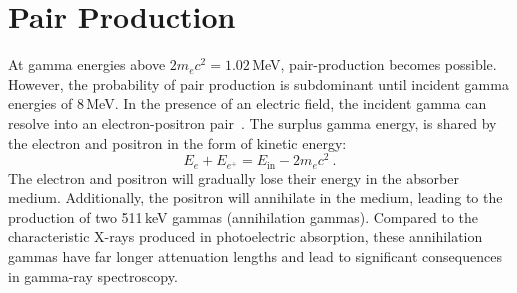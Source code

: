\section{Pair Production}
At gamma energies above $2m_ec^2 = 1.02$\,MeV, pair-production becomes possible. However, the probability of pair production is subdominant until incident gamma energies of 8\,MeV. In the presence of an electric field, the incident gamma can resolve into an electron-positron pair~\cite{pair_production}. The surplus gamma energy, is shared by the electron and positron in the form of kinetic energy:
\begin{equation}
	E_e + E_{e^+} = E_\text{in} - 2m_ec^2~.
\label{eq:pairproduction_intro}
\end{equation}
The electron and positron will gradually lose their energy in the absorber medium. Additionally, the positron will annihilate in the medium, leading to the production of two 511\,keV gammas (annihilation gammas). Compared to the characteristic X-rays produced in photoelectric absorption, these annihilation gammas have far longer attenuation lengths and lead to significant consequences in gamma-ray spectroscopy.  

